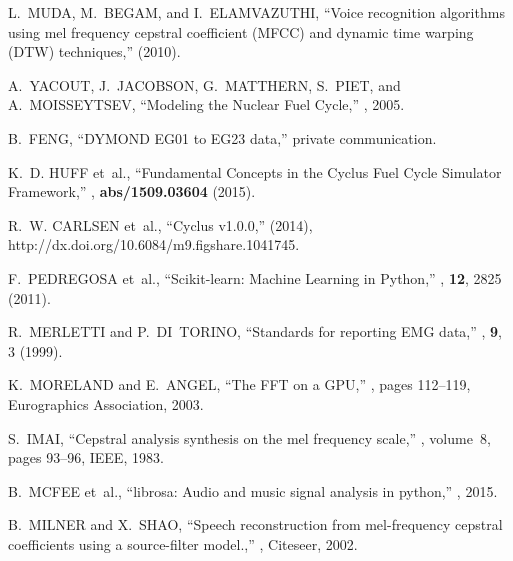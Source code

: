\documentclass{ntmanuscript}
\begin{document}
\begin{thebibliography}{10}
L.~MUDA, M.~BEGAM, and I.~ELAMVAZUTHI,
\newblock ``Voice recognition algorithms using mel frequency cepstral
  coefficient (MFCC) and dynamic time warping (DTW) techniques,''
 (2010).

A.~YACOUT, J.~JACOBSON, G.~MATTHERN, S.~PIET, and A.~MOISSEYTSEV,
\newblock ``Modeling the Nuclear Fuel Cycle,''
, 2005.

B.~FENG,
\newblock ``DYMOND EG01 to EG23 data,''
\newblock private communication.

K.~D. HUFF et~al.,
\newblock ``Fundamental Concepts in the Cyclus Fuel Cycle Simulator
  Framework,''
, {\bf abs/1509.03604} (2015).

R.~W. CARLSEN et~al.,
\newblock ``{Cyclus v1.0.0},''
\newblock (2014),
\newblock http://dx.doi.org/10.6084/m9.figshare.1041745.

F.~PEDREGOSA et~al.,
\newblock ``Scikit-learn: Machine Learning in {P}ython,''
, {\bf 12}, 2825 (2011).

R.~MERLETTI and P.~DI~TORINO,
\newblock ``Standards for reporting EMG data,''
, {\bf 9}, 3 (1999).

K.~MORELAND and E.~ANGEL,
\newblock ``The FFT on a GPU,''
, pages 112--119, Eurographics Association, 2003.

S.~IMAI,
\newblock ``Cepstral analysis synthesis on the mel frequency scale,''
, volume~8, pages 93--96, IEEE, 1983.

B.~MCFEE et~al.,
\newblock ``librosa: Audio and music signal analysis in python,''
,
  2015.

B.~MILNER and X.~SHAO,
\newblock ``Speech reconstruction from mel-frequency cepstral coefficients
  using a source-filter model.,''
, Citeseer, 2002.


\end{thebibliography}
\end{document}
